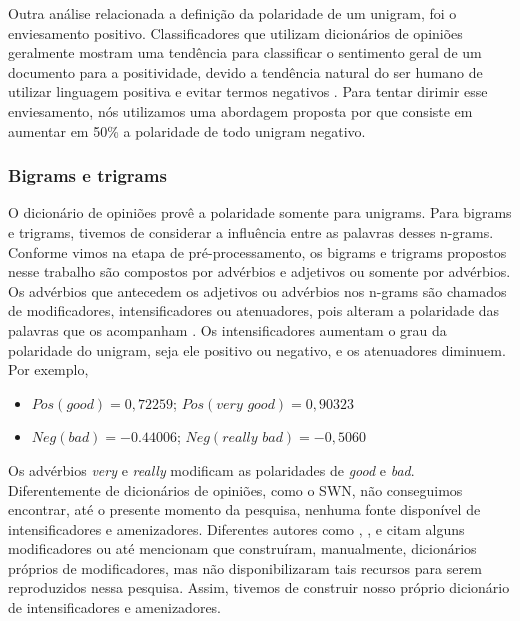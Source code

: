 Outra análise relacionada a definição da polaridade de um unigram, foi o enviesamento positivo. Classificadores que utilizam dicionários de opiniões geralmente mostram uma tendência para classificar o sentimento geral de um documento para a positividade, devido a tendência natural do ser humano de utilizar linguagem positiva e evitar termos negativos \cite{boucher1969pollyanna, kennedy2006sentiment}. Para tentar dirimir esse enviesamento, nós utilizamos uma abordagem proposta por \cite{taboada2011lexicon} que consiste em aumentar em 50\% a polaridade de todo unigram negativo. 

\subsubsection{Bigrams e trigrams}

O dicionário de opiniões provê a polaridade somente para unigrams. Para bigrams e trigrams, tivemos de considerar a influência entre as palavras desses n-grams. Conforme vimos na etapa de pré-processamento, os bigrams e trigrams propostos nesse trabalho são compostos por advérbios e adjetivos ou somente por advérbios. Os advérbios que antecedem os adjetivos ou advérbios nos n-grams são chamados de modificadores, intensificadores ou atenuadores, pois alteram a polaridade das palavras que os acompanham \cite{voll2007not}. Os intensificadores aumentam o grau da polaridade do unigram, seja ele positivo ou negativo, e os atenuadores diminuem. Por exemplo, 

\begin{itemize}
\item \label{itm:very_exem} $Pos(\textit{good}) = 0,72259$; $Pos(\textit{very good}) = 0,90323$
\item \label{itm:really_exem} $Neg(\textit{bad}) = -0.44006$; $Neg(\textit{really bad}) = -0,5060$
\end{itemize}

Os advérbios \textit{very} e \textit{really} modificam as polaridades de \textit{good} e \textit{bad}. Diferentemente de dicionários de opiniões, como o SWN, não conseguimos encontrar, até o presente momento da pesquisa, nenhuma fonte disponível de intensificadores e amenizadores. Diferentes autores como \cite{voll2007not}, \cite{taboada2008extracting}, \cite{taboada2011lexicon} e \cite{pimpalkar2013sentimental} citam alguns modificadores ou até mencionam que construíram, manualmente, dicionários próprios de modificadores, mas não disponibilizaram tais recursos para serem reproduzidos nessa pesquisa. Assim, tivemos de construir nosso próprio dicionário de intensificadores e amenizadores. 

